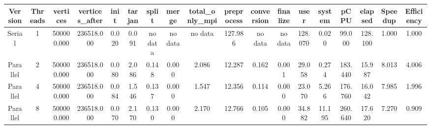 \begin{tabular}{|c|c|c|c|c|c|c|c|c|c|c|c|c|c|c|c|c|c|}
\toprule
 Version &  Threads &   vertices &  vertices\_after &  init &  tarjan &   split &   merge & total\_only\_mpi &  preprocess & conversion & finalize &    user &  system &    pCPU &  elapsed &  Speedup &  Efficiency \\
\midrule
  Serial &        1 & 500000.000 &      236518.000 & 0.020 &   0.091 & no data & no data &        no data &     127.986 &    no data &  no data & 128.070 &   0.020 &  99.000 &  128.100 &    1.000 &       1.000 \\
Parallel &        2 & 500000.000 &      236518.000 & 0.080 &   2.086 &   0.148 &   0.000 &          2.086 &      12.287 &      0.162 &    0.001 &  29.058 &   0.274 & 183.440 &   15.987 &    8.013 &       4.006 \\
Parallel &        4 & 500000.000 &      236518.000 & 0.084 &   1.546 &   0.137 &   0.000 &          1.547 &      12.356 &      0.114 &    0.000 &  23.070 &   5.266 & 176.760 &   16.042 &    7.985 &       1.996 \\
Parallel &        8 & 500000.000 &      236518.000 & 0.070 &   2.170 &   0.130 &   0.000 &          2.170 &      12.766 &      0.105 &    0.000 &  34.882 &  11.195 & 260.640 &   17.620 &    7.270 &       0.909 \\
\bottomrule
\end{tabular}
